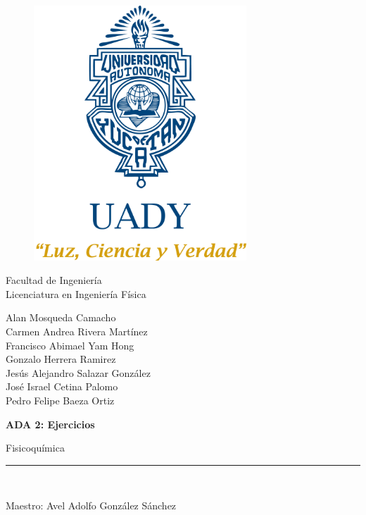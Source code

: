 \documentclass[12pt]{article}
\begin{document}
	\begin{titlepage}
		
		\begin{center}
			\vspace*{-1in}
			\begin{figure}[htb]
				\begin{center}
					\includegraphics[width=8cm]{logo}
				\end{center}
			\end{figure}
			
			Facultad de Ingeniería\\
			\vspace*{0.15in}
			Licenciatura en Ingeniería Física \\
			\vspace*{0.2in}
			\begin{large}
				Alan Mosqueda Camacho\\
				Carmen Andrea Rivera Martínez\\
				Francisco Abimael Yam Hong\\
				Gonzalo Herrera Ramirez\\
				Jesús Alejandro Salazar González\\
				José Israel Cetina Palomo\\
				Pedro Felipe Baeza Ortiz\\
			\end{large}
			\vspace*{0.2in}
			\begin{Large}
				\textbf{ADA 2: Ejercicios} \\
			\end{Large}
			\vspace*{0.2in}
			\begin{large}
				Fisicoquímica \\
			\end{large}
			\vspace*{0.3in}
			\rule{80mm}{0.1mm}\\
			\vspace*{0.1in}
			\begin{large}
				Maestro: Avel Adolfo González Sánchez\\
			\end{large}
		\end{center}
		
	\end{titlepage}
\end{document}
